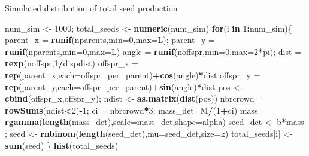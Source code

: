 \documentclass[
  ignorenonframetext,
]{beamer}
\newenvironment{Shaded}{\begin{snugshade}}{\end{snugshade}}
\newcommand{\ControlFlowTok}[1]{\textcolor[rgb]{0.13,0.29,0.53}{\textbf{#1}}}
\newcommand{\DataTypeTok}[1]{\textcolor[rgb]{0.13,0.29,0.53}{#1}}
\newcommand{\DecValTok}[1]{\textcolor[rgb]{0.00,0.00,0.81}{#1}}
\newcommand{\KeywordTok}[1]{\textcolor[rgb]{0.13,0.29,0.53}{\textbf{#1}}}
\newcommand{\NormalTok}[1]{#1}
\newcommand{\OperatorTok}[1]{\textcolor[rgb]{0.81,0.36,0.00}{\textbf{#1}}}
\newcommand{\StringTok}[1]{\textcolor[rgb]{0.31,0.60,0.02}{#1}}
\begin{document}
\begin{frame}[fragile]{Simulated distribution of total seed production}
\protect\hypertarget{simulated-distribution-of-total-seed-production}{}

\tiny

\begin{Shaded}
\begin{Highlighting}[]
\NormalTok{num_sim <-}\StringTok{ }\DecValTok{1000}\NormalTok{; total_seeds <-}\StringTok{ }\KeywordTok{numeric}\NormalTok{(num_sim)}
\ControlFlowTok{for}\NormalTok{(i }\ControlFlowTok{in} \DecValTok{1}\OperatorTok{:}\NormalTok{num_sim)\{}
\NormalTok{parent_x =}\StringTok{ }\KeywordTok{runif}\NormalTok{(nparents,}\DataTypeTok{min=}\DecValTok{0}\NormalTok{,}\DataTypeTok{max=}\NormalTok{L); parent_y =}\StringTok{ }\KeywordTok{runif}\NormalTok{(nparents,}\DataTypeTok{min=}\DecValTok{0}\NormalTok{,}\DataTypeTok{max=}\NormalTok{L)}
\NormalTok{angle =}\StringTok{ }\KeywordTok{runif}\NormalTok{(noffspr,}\DataTypeTok{min=}\DecValTok{0}\NormalTok{,}\DataTypeTok{max=}\DecValTok{2}\OperatorTok{*}\NormalTok{pi); dist =}\StringTok{ }\KeywordTok{rexp}\NormalTok{(noffspr,}\DecValTok{1}\OperatorTok{/}\NormalTok{dispdist)}
\NormalTok{offspr_x =}\StringTok{ }\KeywordTok{rep}\NormalTok{(parent_x,}\DataTypeTok{each=}\NormalTok{offspr_per_parent)}\OperatorTok{+}\KeywordTok{cos}\NormalTok{(angle)}\OperatorTok{*}\NormalTok{dist}
\NormalTok{offspr_y =}\StringTok{ }\KeywordTok{rep}\NormalTok{(parent_y,}\DataTypeTok{each=}\NormalTok{offspr_per_parent)}\OperatorTok{+}\KeywordTok{sin}\NormalTok{(angle)}\OperatorTok{*}\NormalTok{dist}
\NormalTok{pos <-}\StringTok{ }\KeywordTok{cbind}\NormalTok{(offspr_x,offspr_y); ndist <-}\StringTok{ }\KeywordTok{as.matrix}\NormalTok{(}\KeywordTok{dist}\NormalTok{(pos))}
\NormalTok{nbrcrowd =}\StringTok{ }\KeywordTok{rowSums}\NormalTok{(ndist}\OperatorTok{<}\DecValTok{2}\NormalTok{)}\OperatorTok{-}\DecValTok{1}\NormalTok{; ci =}\StringTok{ }\NormalTok{nbrcrowd}\OperatorTok{*}\DecValTok{3}\NormalTok{; mass_det=M}\OperatorTok{/}\NormalTok{(}\DecValTok{1}\OperatorTok{+}\NormalTok{ci)}
\NormalTok{mass =}\StringTok{ }\KeywordTok{rgamma}\NormalTok{(}\KeywordTok{length}\NormalTok{(mass_det),}\DataTypeTok{scale=}\NormalTok{mass_det,}\DataTypeTok{shape=}\NormalTok{alpha)}
\NormalTok{seed_det <-}\StringTok{ }\NormalTok{b}\OperatorTok{*}\NormalTok{mass ; seed <-}\StringTok{ }\KeywordTok{rnbinom}\NormalTok{(}\KeywordTok{length}\NormalTok{(seed_det),}\DataTypeTok{mu=}\NormalTok{seed_det,}\DataTypeTok{size=}\NormalTok{k)}
\NormalTok{total_seeds[i] <-}\StringTok{ }\KeywordTok{sum}\NormalTok{(seed)}
\NormalTok{\}}
\KeywordTok{hist}\NormalTok{(total_seeds)}
\end{Highlighting}
\end{Shaded}


\end{frame}
\end{document}
